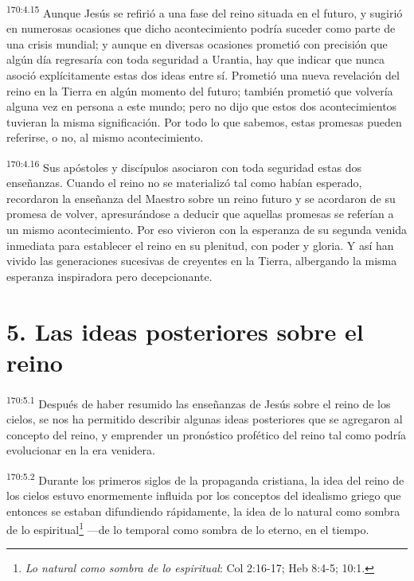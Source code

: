 \par
\textsuperscript{170:4.15} Aunque Jesús se refirió a una fase del reino situada en el futuro, y sugirió en numerosas ocasiones que dicho acontecimiento podría suceder como parte de una crisis mundial; y aunque en diversas ocasiones prometió con precisión que algún día regresaría con toda seguridad a Urantia, hay que indicar que nunca asoció explícitamente estas dos ideas entre sí. Prometió una nueva revelación del reino en la Tierra en algún momento del futuro; también prometió que volvería alguna vez en persona a este mundo; pero no dijo que estos dos acontecimientos tuvieran la misma significación. Por todo lo que sabemos, estas promesas pueden referirse, o no, al mismo acontecimiento.

\par
\textsuperscript{170:4.16} Sus apóstoles y discípulos asociaron con toda seguridad estas dos enseñanzas. Cuando el reino no se materializó tal como habían esperado, recordaron la enseñanza del Maestro sobre un reino futuro y se acordaron de su promesa de volver, apresurándose a deducir que aquellas promesas se referían a un mismo acontecimiento. Por eso vivieron con la esperanza de su segunda venida inmediata para establecer el reino en su plenitud, con poder y gloria. Y así han vivido las generaciones sucesivas de creyentes en la Tierra, albergando la misma esperanza inspiradora pero decepcionante.

\section*{5. Las ideas posteriores sobre el reino}
\par
\textsuperscript{170:5.1} Después de haber resumido las enseñanzas de Jesús sobre el reino de los cielos, se nos ha permitido describir algunas ideas posteriores que se agregaron al concepto del reino, y emprender un pronóstico profético del reino tal como podría evolucionar en la era venidera.

\par
\textsuperscript{170:5.2} Durante los primeros siglos de la propaganda cristiana, la idea del reino de los cielos estuvo enormemente influida por los conceptos del idealismo griego que entonces se estaban difundiendo rápidamente, la idea de lo natural como sombra de lo espiritual\footnote{\textit{Lo natural como sombra de lo espiritual}: Col 2:16-17; Heb 8:4-5; 10:1.} ---de lo temporal como sombra de lo eterno, en el tiempo.

